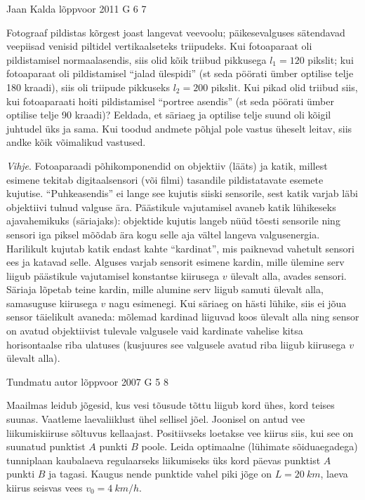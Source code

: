 \documentclass[11pt]{article}
\begin{document}
{%
{Jaan Kalda} %
{lõppvoor} %
{2011} %
{G 6} %
{7} %
{
\ifStatement
Fotograaf pildistas kõrgest joast langevat veevoolu; päikesevalguses sätendavad veepiisad venisid piltidel vertikaalseteks triipudeks.
Kui fotoaparaat oli pildistamisel normaalasendis, siis olid kõik triibud pikkusega $l_1 = \num{120}$ pikslit; kui fotoaparaat oli pildistamisel \enquote{jalad ülespidi} (st seda
pöörati ümber optilise telje \num{180} kraadi), siis oli triipude pikkuseks $l_2 = \num{200}$
pikslit. Kui pikad olid triibud siis, kui fotoaparaati hoiti pildistamisel \enquote{portree
asendis} (st seda pöörati ümber optilise telje \num{90} kraadi)? Eeldada, et säriaeg
ja optilise telje suund oli kõigil juhtudel üks ja sama. Kui toodud andmete
põhjal pole vastus üheselt leitav, siis andke kõik võimalikud vastused.

\emph{Vihje}. 
Fotoaparaadi põhikomponendid on objektiiv (lääts) ja katik, millest
esimene tekitab digitaalsensori (või filmi) tasandile pildistatavate esemete kujutise. \enquote{Puhkeasendis} ei lange see kujutis siiski sensorile, sest katik varjab
läbi objektiivi tulnud valguse ära. Päästikule vajutamisel avaneb katik lühikeseks ajavahemikuks (säriajaks): objektide kujutis langeb nüüd tõesti sensorile
ning sensori iga piksel mõõdab ära kogu selle aja vältel langeva valgusenergia.
Harilikult kujutab katik endast kahte \enquote{kardinat}, mis paiknevad vahetult sensori ees ja katavad selle. Alguses varjab sensorit esimene kardin, mille ülemine
serv liigub päästikule vajutamisel konstantse kiirusega $v$ ülevalt alla, avades
sensori. Säriaja lõpetab teine kardin, mille alumine serv liigub samuti ülevalt
alla, samasuguse kiirusega $v$ nagu esimenegi. Kui säriaeg on hästi lühike, siis
ei jõua sensor täielikult avaneda: mõlemad kardinad liiguvad koos ülevalt alla
ning sensor on avatud objektiivist tulevale valgusele vaid kardinate vahelise
kitsa horisontaalse riba ulatuses (kusjuures see valgusele avatud riba liigub
kiirusega $v$ ülevalt alla).
\fi
}

{Tundmatu autor} %
{lõppvoor} %
{2007} %
{G 5} %
{8} %
{
\ifStatement
Maailmas leidub jõgesid, kus vesi tõusude tõttu liigub kord ühes, kord teises suunas. Vaatleme laevaliiklust ühel sellisel jõel. Joonisel on antud vee liikumiskiiruse sõltuvus kellaajast. Positiivseks loetakse vee kiirus siis, kui see on suunatud punktist $A$ punkti $B$ poole. Leida optimaalne (lühimate sõiduaegadega) tunniplaan kaubalaeva regulaarseks liikumiseks üks kord päevas punktist $A$ punkti $B$ ja tagasi. Kaugus nende punktide vahel piki jõge on $L = \SI{20}{km}$, laeva kiirus seisvas vees $v_0 = \SI{4}{km/h}$.

}}
\end{document}
